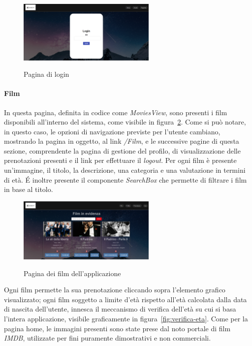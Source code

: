\begin{figure}[ht]
    \centering
    \includegraphics[width=0.6\textwidth, alt={Pagina di accesso all'applicazione}]{immagini/frontend/login.png}
    \caption{Pagina di login}\label{fig:pagina-login}
\end{figure}

\paragraph{Film}\label{par:film}

In questa pagina, definita in codice come \textit{MoviesView}, sono presenti i film disponibili all'interno del sistema, come visibile in figura~\ref{fig:pagina-film}.
Come si può notare, in questo caso, le opzioni di navigazione previste per l'utente cambiano, mostrando la pagina in oggetto, al link \textit{/Film},
e le successive pagine di questa sezione, comprendente la pagina di gestione del profilo, di visualizzazione delle prenotazioni presenti e il link per effettuare il \textit{logout}.
Per ogni film è presente un'immagine, il titolo, la descrizione, una categoria e una valutazione in termini di età.
É inoltre presente il componente \textit{SearchBox} che permette di filtrare i film in base al titolo.

\begin{figure}[ht]
    \centering
    \includegraphics[width=0.6\textwidth, alt={Pagina contenente i film dell'applicazione}]{immagini/frontend/movies.png}
    \caption{Pagina dei film dell'applicazione}\label{fig:pagina-film}
\end{figure}

Ogni film permette la sua prenotazione cliccando sopra l'elemento grafico visualizzato; ogni film soggetto a limite d'età rispetto all'età
calcolata dalla data di nascita dell'utente, innesca il meccanismo di verifica dell'età su cui si basa l'intera applicazione, visibile graficamente
in figura~\ref{fig:verifica-eta}.
Come per la pagina home, le immagini presenti sono state prese dal noto portale di film \textit{IMDB}, utilizzate per fini puramente dimostrativi e non commerciali.

